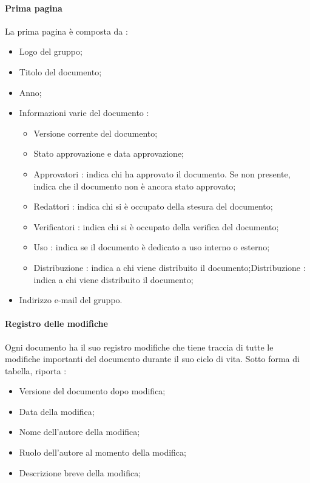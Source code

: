 \paragraph{Prima pagina}
La prima pagina è composta da :
\begin{itemize}
  \item Logo del gruppo;
  \item Titolo del documento;
  \item Anno;
  \item Informazioni varie del documento :
  \begin{itemize}
  \item Versione corrente del documento;
  \item Stato approvazione e data approvazione;
  \item Approvatori : indica chi ha approvato il documento. Se non presente, indica che il documento non è ancora stato approvato;
  \item Redattori : indica chi si è occupato della stesura del documento;
  \item Verificatori : indica chi si è occupato della verifica del documento;
  \item Uso : indica se il documento è dedicato a uso interno o esterno;
  \item Distribuzione : indica a chi viene distribuito il documento;Distribuzione : indica a chi viene distribuito il documento;
\end{itemize}
\item Indirizzo e-mail del gruppo.
\end{itemize}

\paragraph{Registro delle modifiche}
Ogni documento ha il suo registro modifiche che tiene traccia di tutte le modifiche importanti del documento durante il suo ciclo di vita.
Sotto forma di tabella, riporta :
  \begin{itemize}
  		\item Versione del documento dopo modifica;
  		\item Data della modifica;
  		\item Nome dell’autore della modifica;
  		\item Ruolo dell’autore al momento della modifica;
  		\item Descrizione breve della modifica;
	\end{itemize}

